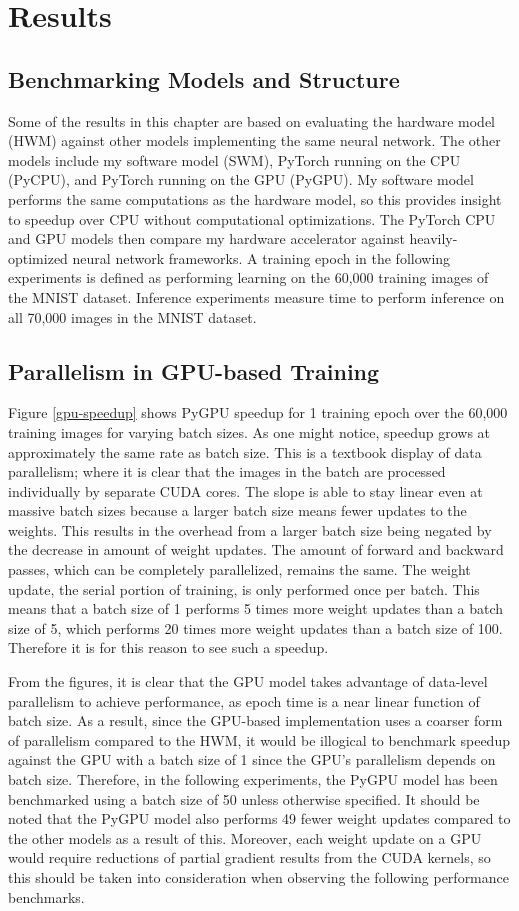 \chapter{Results}\label{results}
\section{Benchmarking Models and Structure}
Some of the results in this chapter are based on evaluating the hardware model (HWM) against other models implementing the same neural network. The other models include my software model (SWM), PyTorch running on the CPU (PyCPU), and PyTorch running on the GPU (PyGPU). My software model performs the same computations as the hardware model, so this provides insight to speedup over CPU without computational optimizations. The PyTorch CPU and GPU models then compare my hardware accelerator against heavily-optimized neural network frameworks. A training epoch in the following experiments is defined as performing learning on the 60,000 training images of the MNIST dataset. Inference experiments measure time to perform inference on all 70,000 images in the MNIST dataset.

\section{Parallelism in GPU-based Training}
Figure \ref{gpu-speedup} shows PyGPU speedup for 1 training epoch over the 60,000 training images for varying batch sizes. As one might notice, speedup grows at approximately the same rate as batch size. This is a textbook display of data parallelism; where it is clear that the images in the batch are processed individually by separate CUDA cores. The slope is able to stay linear even at massive batch sizes because a larger batch size means fewer updates to the weights. This results in the overhead from a larger batch size being negated by the decrease in amount of weight updates. The amount of forward and backward passes, which can be completely parallelized, remains the same. The weight update, the serial portion of training, is only performed once per batch. This means that a batch size of 1 performs 5 times more weight updates than a batch size of 5, which performs 20 times more weight updates than a batch size of 100. Therefore it is for this reason to see such a  speedup.  

From the figures, it is clear that the GPU model takes advantage of data-level parallelism to achieve performance, as epoch time is a near linear function of batch size. As a result, since the GPU-based implementation uses a coarser form of parallelism compared to the HWM, it would be illogical to benchmark speedup against the GPU with a batch size of 1 since the GPU's parallelism depends on batch size. Therefore, in the following experiments, the PyGPU model has been benchmarked using a batch size of 50 unless otherwise specified. It should be noted that the PyGPU model also performs 49 fewer weight updates compared to the other models as a result of this. Moreover, each weight update on a GPU would require reductions of partial gradient results from the CUDA kernels, so this should be taken into consideration when observing the following performance benchmarks.

